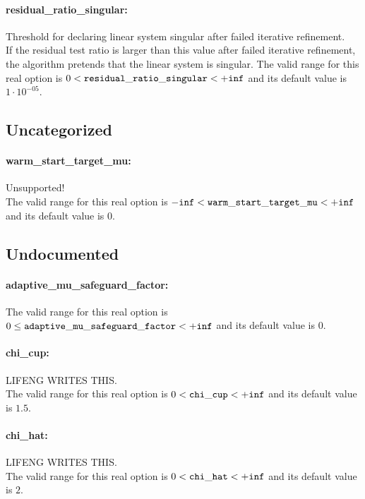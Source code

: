 \paragraph{residual\_ratio\_singular:}\label{sec:residual_ratio_singular} Threshold for declaring linear system singular after failed iterative refinement. $\;$ \\
 If the residual test ratio is larger than this
value after failed iterative refinement, the
algorithm pretends that the linear system is
singular. The valid range for this real option is 
$0 <  {\tt residual\_ratio\_singular } <  {\tt +inf}$
and its default value is $1 \cdot 10^{-05}$.


\subsection{Uncategorized}
\label{sec:Uncategorized}
\paragraph{warm\_start\_target\_mu:}\label{sec:warm_start_target_mu} Unsupported! $\;$ \\
 The valid range for this real option is 
${\tt -inf} <  {\tt warm\_start\_target\_mu } <  {\tt +inf}$
and its default value is $0$.


\subsection{Undocumented}
\label{sec:Undocumented}
\paragraph{adaptive\_mu\_safeguard\_factor:}\label{sec:adaptive_mu_safeguard_factor}  $\;$ \\
 The valid range for this real option is 
$0 \le {\tt adaptive\_mu\_safeguard\_factor } <  {\tt +inf}$
and its default value is $0$.


\paragraph{chi\_cup:}\label{sec:chi_cup} LIFENG WRITES THIS. $\;$ \\
 The valid range for this real option is 
$0 <  {\tt chi\_cup } <  {\tt +inf}$
and its default value is $1.5$.


\paragraph{chi\_hat:}\label{sec:chi_hat} LIFENG WRITES THIS. $\;$ \\
 The valid range for this real option is 
$0 <  {\tt chi\_hat } <  {\tt +inf}$
and its default value is $2$.


